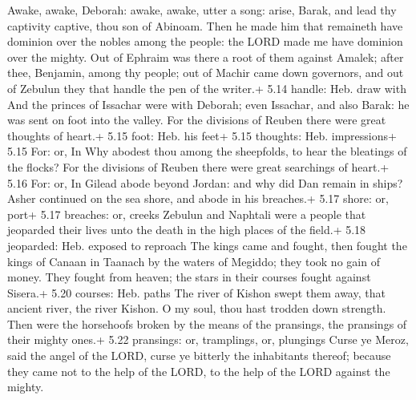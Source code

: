  Awake, awake, Deborah: awake, awake, utter a song: arise,
Barak, and lead thy captivity captive, thou son of Abinoam.
 Then he made him that remaineth have dominion over the
nobles among the people: the LORD made me have dominion over the mighty.
 Out of Ephraim was there a root of them against Amalek;
after thee, Benjamin, among thy people; out of Machir came down
governors, and out of Zebulun they that handle the pen of the writer.+
5.14 handle: Heb. draw with  And the princes of Issachar
were with Deborah; even Issachar, and also Barak: he was sent on foot
into the valley. For the divisions of Reuben there were great thoughts
of heart.+ 5.15 foot: Heb. his feet+ 5.15 thoughts: Heb. impressions+
5.15 For: or, In  Why abodest thou among the sheepfolds, to
hear the bleatings of the flocks? For the divisions of Reuben there were
great searchings of heart.+ 5.16 For: or, In  Gilead abode
beyond Jordan: and why did Dan remain in ships? Asher continued on the
sea shore, and abode in his breaches.+ 5.17 shore: or, port+ 5.17
breaches: or, creeks  Zebulun and Naphtali were a people
that jeoparded their lives unto the death in the high places of the
field.+ 5.18 jeoparded: Heb. exposed to reproach  The kings
came and fought, then fought the kings of Canaan in Taanach by the
waters of Megiddo; they took no gain of money.  They fought
from heaven; the stars in their courses fought against Sisera.+ 5.20
courses: Heb. paths  The river of Kishon swept them away,
that ancient river, the river Kishon. O my soul, thou hast trodden down
strength.  Then were the horsehoofs broken by the means of
the pransings, the pransings of their mighty ones.+ 5.22 pransings: or,
tramplings, or, plungings  Curse ye Meroz, said the angel
of the LORD, curse ye bitterly the inhabitants thereof; because they
came not to the help of the LORD, to the help of the LORD against the
mighty.

